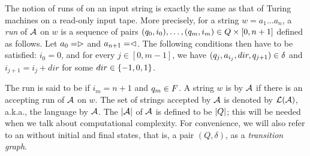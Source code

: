 
The notion of runs of \FFA{} on an input string is exactly the same as that of
Turing machines on a read-only input tape. More precisely, for a string 
$w = a_1 \dots a_n$, a \emph{run} of $\mathcal{A}$ on $w$
is a sequence of pairs $(q_0,i_0),\ldots, (q_m,i_m) \in Q \times [0, n+1]$ 
defined as follows. Let $a_0 = \vartriangleright$ and $a_{n+1} = \vartriangleleft$. The
following conditions then have to be satisfied: $i_0 = 0$, and for every $j \in [0, m-1]$, we have $(q_j,a_{i_j}, dir, q_{j+1}) \in
	\delta$ and $i_{j+1} = i_j + dir$ for some $dir \in  \{-1, 0, 1\}$.

The run is said to be  if $i_m = n+1$ and $q_m \in F$.
A string $w$ is  by $\mathcal{A}$ if there is an accepting run of
$\mathcal{A}$ on $w$. The set of strings accepted by $\mathcal{A}$ is denoted by $\mathcal{L}(\mathcal{A})$,
a.k.a., the language  by $\mathcal{A}$.
The  $|\mathcal{A}|$ of $\mathcal{A}$ is defined to be $|Q|$; this will
be needed when we talk about computational complexity.
%
For convenience, we will also refer to an \FA{} without initial and final states, that is, a pair $(Q, \delta)$, as a \emph{transition graph}.


